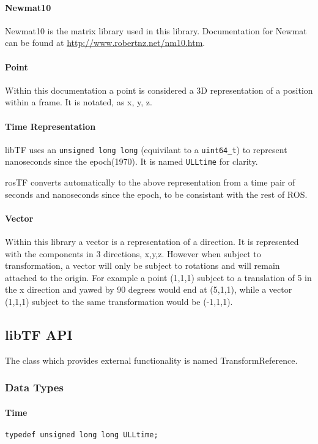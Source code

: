 \documentclass[12pt]{article}
\begin{document}
\paragraph {Newmat10}
Newmat10 is the matrix library used in this library.  Documentation for Newmat can be found at 
\url{http://www.robertnz.net/nm10.htm}.  

\paragraph {Point}
Within this documentation a point is considered a 3D representation of a position within a 
frame.  It is notated, as x, y, z.  

\paragraph {Time Representation}
libTF uses an \texttt{unsigned long long} (equivilant to a \texttt{uint64\_t}) to represent nanoseconds since the epoch(1970).  
It is named \texttt{ULLtime} for clarity.

rosTF converts automatically to the above representation from a time pair of seconds and nanoseconds since the epoch, to 
be consistant with the rest of ROS.  

\paragraph{Vector}
Within this library a vector is a representation of a direction.  It is represented with the components in 3 directions, 
x,y,z.  However when subject to transformation, a vector will only be subject to rotations and will remain attached to the 
origin.  For example a point (1,1,1) subject to a translation of 5 in the x direction and yawed by 90 degrees would end
at (5,1,1), while a vector (1,1,1) subject to the same transformation would be (-1,1,1).  

\subsection{libTF API}
\label{libTFAPI}
The class which provides external functionality is named TransformReference.  

\subsubsection{Data Types}
\paragraph {Time}
\begin{verbatim}
typedef unsigned long long ULLtime;
\end{verbatim}
\end{document}
